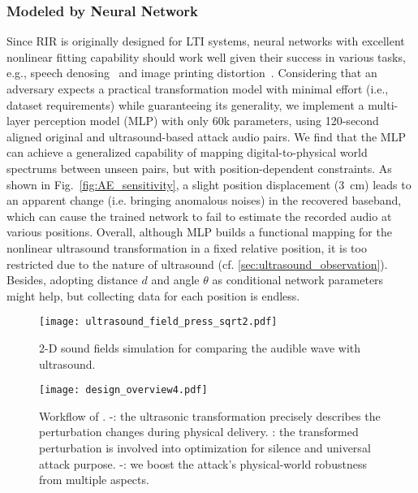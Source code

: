 \subsubsection{Modeled by Neural Network}\label{sec:classic_nn}
Since RIR is originally designed for LTI systems, neural networks with excellent nonlinear fitting capability should work well given their success in various tasks, e.g., speech denosing~\cite{hu2020dccrn} and image printing distortion~\cite{jan2019connecting}. 
Considering that an adversary expects a practical transformation model with minimal effort (i.e., dataset requirements) while guaranteeing its generality, we implement a multi-layer perception model (MLP) with only 60k parameters, using 120-second aligned original and ultrasound-based attack audio pairs. We find that the MLP can achieve a generalized capability of mapping digital-to-physical world spectrums between unseen pairs, but with position-dependent constraints. As shown in Fig.~\ref{fig:AE_sensitivity}, a slight position displacement (3~cm) leads to an apparent change (i.e. bringing anomalous noises) in the recovered baseband, which can cause the trained network to fail to estimate the recorded audio at various positions. 
Overall, although MLP builds a functional mapping for the nonlinear ultrasound transformation in a fixed relative position, it is too restricted due to the nature of ultrasound (cf. \textsection\ref{sec:ultrasound_observation}). Besides, adopting distance $d$ and angle $\theta$ as conditional network parameters might help, but collecting data for each position is endless.



\begin{figure}[t]
    \centering
    \texttt{[image: ultrasound\_field\_press\_sqrt2.pdf]}
    \caption{\label{fig:soundfield}2-D sound fields simulation for comparing the audible wave with ultrasound.}
    \vspace{-15pt}
\end{figure}

\begin{figure*}[!t]
    \centering
    \texttt{[image: design\_overview4.pdf]}
    \caption{Workflow of \alias. -: the ultrasonic transformation precisely describes the perturbation changes during physical delivery. : the transformed perturbation is involved into optimization for silence and universal attack purpose. -: we boost the attack's physical-world robustness from multiple aspects.}
    \label{fig:design_overview}
    \vspace{-15pt}
\end{figure*}


